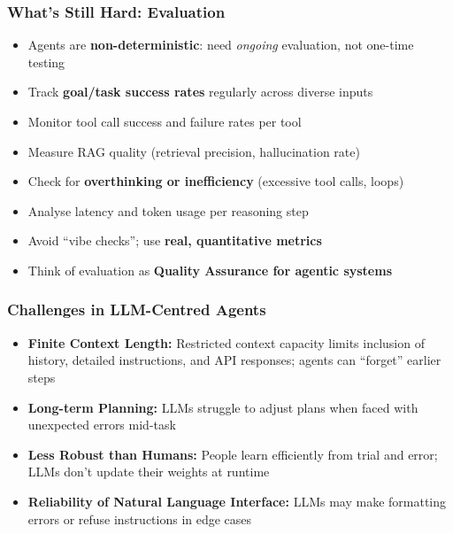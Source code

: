 \begin{frame}[fragile]\frametitle{What's Still Hard: Evaluation}
      \begin{itemize}
        \item Agents are \textbf{non-deterministic}: need \emph{ongoing} evaluation, not one-time testing
        \item Track \textbf{goal/task success rates} regularly across diverse inputs
        \item Monitor tool call success and failure rates per tool
        \item Measure RAG quality (retrieval precision, hallucination rate)
        \item Check for \textbf{overthinking or inefficiency} (excessive tool calls, loops)
        \item Analyse latency and token usage per reasoning step
        \item Avoid ``vibe checks''; use \textbf{real, quantitative metrics}
        \item Think of evaluation as \textbf{Quality Assurance for agentic systems}
      \end{itemize}
\end{frame}


\begin{frame}[fragile]\frametitle{Challenges in LLM-Centred Agents}
  \begin{itemize}
    \item \textbf{Finite Context Length:} Restricted context capacity limits inclusion of history, detailed instructions, and API responses; agents can ``forget'' earlier steps
    \item \textbf{Long-term Planning:} LLMs struggle to adjust plans when faced with unexpected errors mid-task
    \item \textbf{Less Robust than Humans:} People learn efficiently from trial and error; LLMs don't update their weights at runtime
    \item \textbf{Reliability of Natural Language Interface:} LLMs may make formatting errors or refuse instructions in edge cases
  \end{itemize}
\end{frame}

